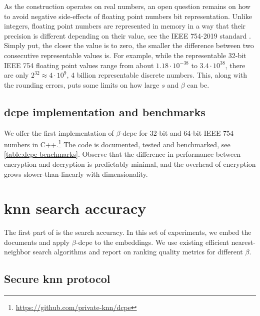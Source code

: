 			As the construction operates on real numbers, an open question remains on how to avoid negative side-effects of floating point numbers bit representation.
			Unlike integers, floating point numbers are represented in memory in a way that their precision is different depending on their value, see the IEEE 754-2019 standard \cite{ieee-floating-point}. %
			Simply put, the closer the value is to zero, the smaller the difference between two consecutive representable values is.
			For example, while the representable 32-bit IEEE 754 floating point values range from about $1.18 \cdot 10^{-38}$ to $3.4 \cdot 10^{38}$, there are only $2^{32} \approx 4 \cdot 10^9$, 4 billion representable discrete numbers.
			This, along with the rounding errors, puts some limits on how large $s$ and $\beta$ can be.

		\subsection{\texorpdfstring{\acrshort{dcpe}}{DCPE} implementation and benchmarks}

			We offer the first implementation of \cite{dcpe} $\beta$-\acrshort{dcpe} for 32-bit and 64-bit IEEE 754 numbers in C++.\footnote{
				\url{https://github.com/private-knn/dcpe}
			}
			The code is documented, tested and benchmarked, see \cref{table:dcpe-benchmarks}.
			Observe that the difference in performance between encryption and decryption is predictably minimal, and the overhead of encryption grows slower-than-linearly with dimensionality.

			

	\section{\texorpdfstring{\acrshort{knn}}{kNN} search accuracy}\label{section:knn-snapshot:search}

		The first part of \kanon{} is the search accuracy.
		In this set of experiments, we embed the documents and apply $\beta$-\acrshort{dcpe} to the embeddings.
		We use existing efficient nearest-neighbor search algorithms and report on ranking quality metrics for different $\beta$.

		\subsection{Secure \texorpdfstring{\acrshort{knn}}{kNN} protocol}


